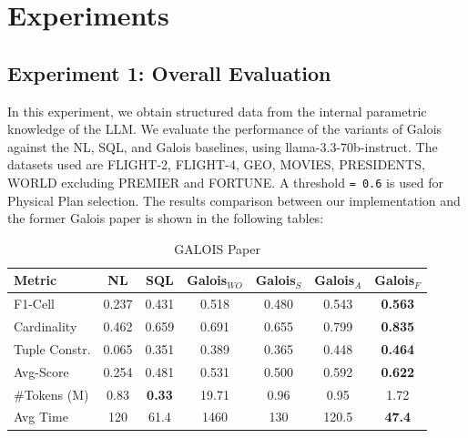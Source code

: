 \section{Experiments}

\subsection{Experiment 1: Overall Evaluation} 
In this experiment, we obtain structured data from the internal
parametric knowledge of the LLM. We evaluate the performance of the variants of Galois against
the NL, SQL, and Galois baselines, using llama-3.3-70b-instruct. The datasets used are FLIGHT-2, FLIGHT-4, GEO, MOVIES, PRESIDENTS, WORLD excluding PREMIER and FORTUNE.
A threshold \texttt{\texttau = 0.6} is used for Physical Plan selection.
The results comparison between our implementation and the former Galois paper is shown in the following tables:

\begin{table}[H]
\centering
\begin{tabular}{lcccccc}
\hline
\textbf{Metric} & \textbf{NL} & \textbf{SQL} & \textbf{Galois$_{WO}$} & \textbf{Galois$_S$} & \textbf{Galois$_A$} & \textbf{Galois$_F$} \\
\hline
F1-Cell        & 0.237 & 0.431 & 0.518 & 0.480 & 0.543 & \textbf{0.563} \\
Cardinality    & 0.462 & 0.659 & 0.691 & 0.655 & 0.799 & \textbf{0.835} \\
Tuple Constr.  & 0.065 & 0.351 & 0.389 & 0.365 & 0.448 & \textbf{0.464} \\
Avg-Score      & 0.254 & 0.481 & 0.531 & 0.500 & 0.592 & \textbf{0.622} \\
\#Tokens (M)   & 0.83  & \textbf{0.33} & 19.71 & 0.96 & 0.95 & 1.72 \\
Avg Time       & 120   & 61.4  & 1460  & 130  & 120.5 & \textbf{47.4} \\
\hline
\end{tabular}
\caption{GALOIS Paper}
\label{tab:galois_comparison}
\end{table}

